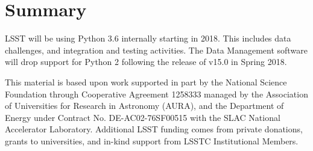 \documentclass[11pt,twoside]{article}
\begin{document}
\section{Summary}

LSST will be using Python 3.6 internally starting in 2018.
This includes data challenges, and integration and testing activities.
The Data Management software will drop support for Python 2 following the release of v15.0 in Spring 2018.

\acknowledgements This material is based upon work supported in part by the National Science Foundation through Cooperative Agreement 1258333 managed by the Association of Universities for Research in Astronomy (AURA), and the Department of Energy under Contract No. DE-AC02-76SF00515 with the SLAC National Accelerator Laboratory. Additional LSST funding comes from private donations, grants to universities, and in-kind support from LSSTC Institutional Members.

\end{document}
